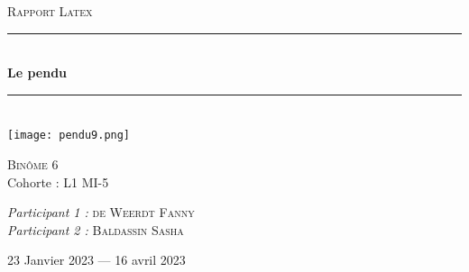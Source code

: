 \documentclass[french,10pt,a4paper]{article}	%
\newcommand{\HRule}{\rule{\linewidth}{0.5mm}}
\begin{document}
\begin{titlepage}
  \begin{sffamily}
  \begin{center}

    \textsc{\LARGE Rapport Latex}\\[2cm]

    \HRule \\[0.4cm]{\huge \bfseries Le pendu \\[0.4cm]}
    \HRule \\[2cm]
    
    \texttt{[image: pendu9.png]}
    \\[2cm]	%
    
    \begin{minipage}{0.4\textwidth}
      \begin{flushleft} \large
        \textsc{Binôme 6}\\
        Cohorte : L1 MI-5\\
      \end{flushleft}
    \end{minipage}
    \begin{minipage}{0.4\textwidth}
      \begin{flushright} \large
        \emph{Participant 1 : } \textsc{de Weerdt Fanny}\\
        \emph{Participant 2 : } \textsc{Baldassin Sasha}
      \end{flushright}
    \end{minipage}

    \vfill %

    {\large 23 Janvier 2023 — 16 avril 2023}

  \end{center}
  \end{sffamily}
\end{titlepage}

\newpage
\end{document}
